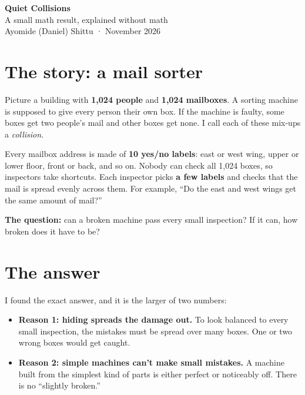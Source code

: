 \documentclass[11pt]{article}
\begin{document}
\pagestyle{empty}

{\LARGE\bfseries Quiet Collisions}\\[3pt]
{\large A small math result, explained without math}\\[2pt]
{\small Ayomide (Daniel) Shittu \;·\; November 2026}

\vspace{6pt}
\section*{The story: a mail sorter}

Picture a building with \textbf{1{,}024 people} and \textbf{1{,}024 mailboxes}.
A sorting machine is supposed to give every person their own box. If the
machine is faulty, some boxes get two people's mail and other boxes get none.
I call each of these mix-ups a \emph{collision}.

Every mailbox address is made of \textbf{10 yes/no labels}: east or west wing,
upper or lower floor, front or back, and so on. Nobody can check all 1{,}024
boxes, so inspectors take shortcuts. Each inspector picks \textbf{a few labels}
and checks that the mail is spread evenly across them. For example, ``Do the
east and west wings get the same amount of mail?''

\textbf{The question:} can a broken machine pass every small inspection? If it
can, how broken does it have to be?

\section*{The answer}

I found the exact answer, and it is the larger of two numbers:

\begin{center}
\end{center}

\begin{itemize}[leftmargin=1.4em, itemsep=3pt]
\item \textbf{Reason 1: hiding spreads the damage out.} To look balanced to
every small inspection, the mistakes must be spread over many boxes. One or
two wrong boxes would get caught.
\item \textbf{Reason 2: simple machines can't make small mistakes.} A machine
built from the simplest kind of parts is either perfect or noticeably off.
There is no ``slightly broken.''
\end{itemize}
\end{document}
